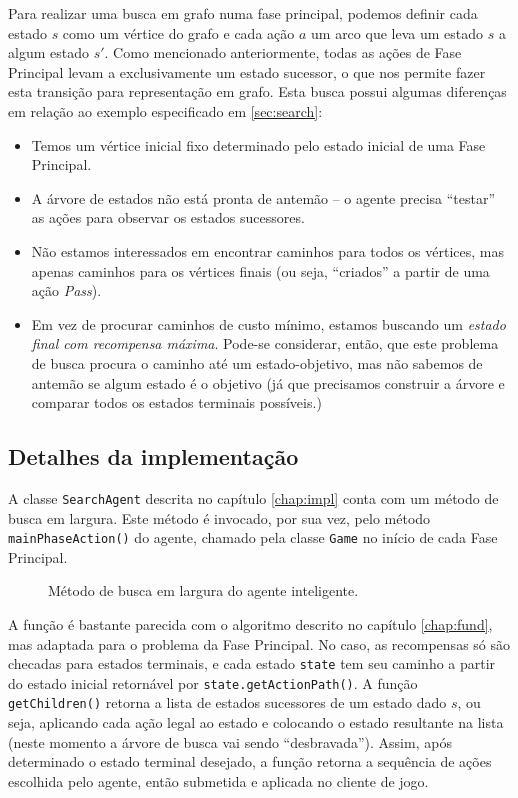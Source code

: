 Para realizar uma busca em grafo numa fase principal, podemos definir cada estado $s$ como um vértice do grafo e cada ação $a$ um arco que leva um estado $s$ a algum estado $s'$. Como mencionado anteriormente, todas as ações de Fase Principal levam a exclusivamente um estado sucessor, o que nos permite fazer esta transição para representação em grafo. Esta busca possui algumas diferenças em relação ao exemplo especificado em \ref{sec:search}:
\begin{itemize}
  \item Temos um vértice inicial fixo determinado pelo estado inicial de uma Fase Principal.
  \item A árvore de estados não está pronta de antemão -- o agente precisa ``testar'' as ações para observar os estados sucessores.
  \item Não estamos interessados em encontrar caminhos para todos os vértices, mas apenas caminhos para os vértices finais (ou seja, ``criados'' a partir de uma ação \textit{Pass}).
  \item Em vez de procurar caminhos de custo mínimo, estamos buscando um \textit{estado final com recompensa máxima}. Pode-se considerar, então, que este problema de busca procura o caminho até um estado-objetivo, mas não sabemos de antemão se algum estado é o objetivo (já que precisamos construir a árvore e comparar todos os estados terminais possíveis.)
\end{itemize}

\subsection{Detalhes da implementação}

A classe \texttt{SearchAgent} descrita no capítulo \ref{chap:impl} conta com um método de busca em largura. Este método é invocado, por sua vez, pelo método \texttt{mainPhaseAction()} do agente, chamado pela classe \texttt{Game} no início de cada Fase Principal.

\begin{figure}[!h]
  \centering
  
  \caption{Método de busca em largura do agente inteligente.}
  \label{breadthfirstsearch}
\end{figure}

A função é bastante parecida com o algoritmo descrito no capítulo \ref{chap:fund}, mas adaptada para o problema da Fase Principal. No caso, as recompensas só são checadas para estados terminais, e cada estado \texttt{state} tem seu caminho a partir do estado inicial retornável por \texttt{state.getActionPath()}. A função \texttt{getChildren()} retorna a lista de estados sucessores de um estado dado $s$, ou seja, aplicando cada ação legal ao estado e colocando o estado resultante na lista (neste momento a árvore de busca vai sendo ``desbravada''). Assim, após determinado o estado terminal desejado, a função retorna a sequência de ações escolhida pelo agente, então submetida e aplicada no cliente de jogo.

